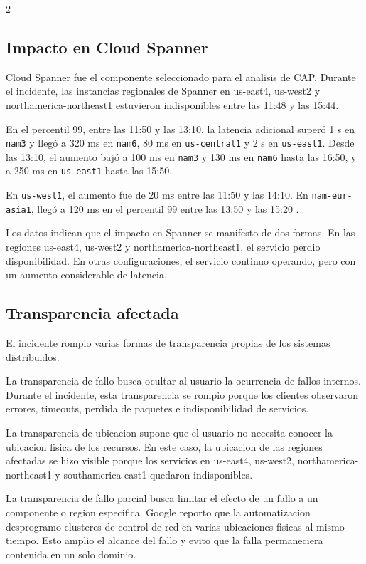 \documentclass[10pt]{article}
\begin{document}
\begin{multicols}{2}
\subsection{Impacto en Cloud Spanner}

Cloud Spanner fue el componente seleccionado para el analisis de CAP. Durante el incidente,
las instancias regionales de Spanner en us-east4, us-west2 y northamerica-northeast1
estuvieron indisponibles entre las 11:48 y las 15:44. \cite{googlecloud19009}

En el percentil 99, entre las 11:50 y las 13:10, la latencia adicional superó 1 s en \texttt{nam3} y llegó a 320 ms en \texttt{nam6}, 80 ms en \texttt{us-central1} y 2 s en \texttt{us-east1}. Desde las 13:10, el aumento bajó a 100 ms en \texttt{nam3} y 130 ms en \texttt{nam6} hasta las 16:50, y a 250 ms en \texttt{us-east1} hasta las 15:50.

En \texttt{us-west1}, el aumento fue de 20 ms entre las 11:50 y las 14:10. En \texttt{nam-eur-asia1}, llegó a 120 ms en el percentil 99 entre las 13:50 y las 15:20 \cite{googlecloud19009}.


Los datos indican que el impacto en Spanner se manifesto de dos formas. En las regiones
us-east4, us-west2 y northamerica-northeast1, el servicio perdio disponibilidad. En otras
configuraciones, el servicio continuo operando, pero con un aumento considerable de latencia.
\cite{googlecloud19009}

\subsection{Transparencia afectada}

El incidente rompio varias formas de transparencia propias de los sistemas distribuidos.

La transparencia de fallo busca ocultar al usuario la ocurrencia de fallos internos. Durante
el incidente, esta transparencia se rompio porque los clientes observaron errores, timeouts,
perdida de paquetes e indisponibilidad de servicios. \cite{googlecloud19009}

La transparencia de ubicacion supone que el usuario no necesita conocer la ubicacion fisica de
los recursos. En este caso, la ubicacion de las regiones afectadas se hizo visible porque los
servicios en us-east4, us-west2, northamerica-northeast1 y southamerica-east1 quedaron
indisponibles. \cite{googlecloud19009}

La transparencia de fallo parcial busca limitar el efecto de un fallo a un componente o region
especifica. Google reporto que la automatizacion desprogramo clusteres de control de red en
varias ubicaciones fisicas al mismo tiempo. Esto amplio el alcance del fallo y evito que la
falla permaneciera contenida en un solo dominio. \cite{googlecloud19009}


\end{multicols}
\end{document}
